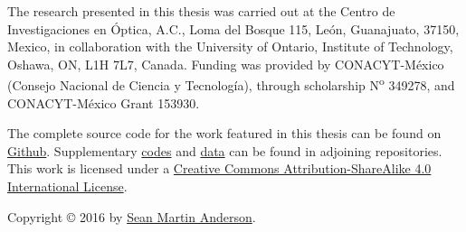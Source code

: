 \begin{titlingpage*}

\let\cleardoublepage\clearpage

\null
\vfill
\parbox{0.7\textwidth}{
The research presented in this thesis was carried out at the Centro de
Investigaciones en \'Optica, A.C., Loma del Bosque 115, Le\'on, Guanajuato,
37150, Mexico, in collaboration with the University of Ontario, Institute of Technology, Oshawa, ON, L1H
7L7, Canada.
Funding was provided by CONACYT-M\'exico (Consejo Nacional de Ciencia y
Tecnolog\'ia), through scholarship {\color{red} N\textsuperscript{o} 349278, and
CONACYT-M\'exico Grant 153930}.

\vspace{0.5cm}

The complete source code for the work featured in this thesis can be found on
\href{https://github.com/roguephysicist/phd-thesis}{Github}. Supplementary
\href{https://github.com/roguephysicist/SHGYield}{codes} and
\href{https://github.com/roguephysicist/shg-si-surfaces}{data} can be found in
adjoining repositories. This work is licensed under a
\href{http://creativecommons.org/licenses/by-sa/4.0/}{Creative Commons
Attribution-ShareAlike 4.0 International License}.



\vspace{0.5cm}

Copyright {\copyright{}} 2016 by 
\href{mailto:sean.martin.anderson@gmail.com}{Sean Martin Anderson}.
}

\end{titlingpage*}
